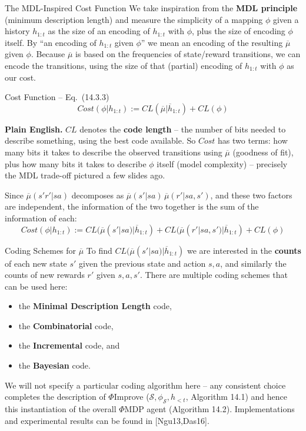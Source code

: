\documentclass[aspectratio=169,10pt]{beamer}
\newcommand{\hlt}{h_{<t}}
\newcommand{\CL}{\mathit{CL}}
\begin{document}
\begin{frame}{The MDL-Inspired Cost Function}
  We take inspiration from the \textbf{MDL principle} (minimum description
  length) and measure the simplicity of a mapping $\phi$ given a history
  $h_{1:t}$ as the size of an encoding of $h_{1:t}$ with $\phi$, plus the
  size of encoding $\phi$ itself. By ``an encoding of $h_{1:t}$ given
  $\phi$'' we mean an encoding of the resulting $\overline\mu$ given
  $\phi$. Because $\overline\mu$ is based on the frequencies of
  state/reward transitions, we can encode the transitions, using the size
  of that (partial) encoding of $h_{1:t}$ with $\phi$ as our cost.
  \begin{block}{Cost Function -- Eq.\ (14.3.3)}
    \[
      \mathit{Cost}(\phi|h_{1:t}) := \CL(\overline\mu|\overline h_{1:t}) + \CL(\phi)
    \]
  \end{block}
  \textbf{Plain English.} $\CL$ denotes the \textbf{code length} -- the
  number of bits needed to describe something, using the best code
  available. So $Cost$ has two terms: how many bits it takes to describe
  the observed transitions using $\overline\mu$ (goodness of fit), plus
  how many bits it takes to describe $\phi$ itself (model complexity) --
  precisely the MDL trade-off pictured a few slides ago.

  \vspace{0.4em}
  Since $\overline\mu(s'r'|sa)$ decomposes as
  $\overline\mu(s'|sa)\,\overline\mu(r'|sa,s')$, and these two factors are
  independent, the information of the two together is the sum of the
  information of each:
  \[
    \mathit{Cost}(\phi|h_{1:t}) := \CL(\overline\mu(s'|sa)|\overline h_{1:t}) + \CL(\overline\mu(r'|sa,s')|\overline h_{1:t}) + \CL(\phi)
  \]
\end{frame}

\begin{frame}{Coding Schemes for $\overline\mu$}
  To find $\CL(\overline\mu(s'|sa)|\overline h_{1:t})$ we are interested in
  the \textbf{counts} of each new state $s'$ given the previous state and
  action $s,a$, and similarly the counts of new rewards $r'$ given
  $s,a,s'$. There are multiple coding schemes that can be used here:
  \begin{itemize}
    \item the \textbf{Minimal Description Length} code,
    \item the \textbf{Combinatorial} code,
    \item the \textbf{Incremental} code, and
    \item the \textbf{Bayesian} code.
  \end{itemize}
  We will not specify a particular coding algorithm here -- any consistent
  choice completes the description of $\Phi$Improve
  ($\mathcal{S},\phi_\mathcal{S},\hlt$, Algorithm 14.1) and hence this
  instantiation of the overall $\Phi$MDP agent (Algorithm 14.2).
  Implementations and experimental results can be found in [Ngu13,Das16].
\end{frame}
\end{document}
